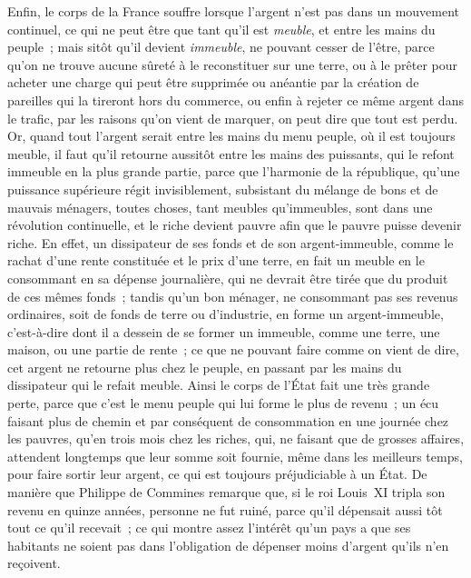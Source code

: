 \documentclass[french,twoside]{book} %
\begin{document}
Enfin, le corps de la France souffre lorsque l’argent n’est pas dans un mouvement continuel, ce qui ne peut être que tant qu’il est {\itshape meuble}, et entre les mains du peuple ; mais sitôt qu’il devient {\itshape immeuble}, ne pouvant cesser de l’être, parce qu’on ne trouve aucune sûreté à le reconstituer sur une terre, ou à le prêter pour acheter une charge qui peut être supprimée ou anéantie par la création de pareilles qui la tireront hors du commerce, ou enfin à rejeter ce même argent dans le trafic, par les raisons qu’on vient de marquer, on peut dire que tout est perdu. Or, quand tout l’argent serait entre les mains du menu peuple, où il est toujours meuble, il faut qu’il retourne aussitôt entre les mains des puissants, qui le refont immeuble en la plus grande partie, parce que l’harmonie de la république, qu’une puissance supérieure régit invisiblement, subsistant du mélange de bons et de mauvais ménagers, toutes choses, tant meubles qu’immeubles, sont dans une révolution continuelle, et le riche devient pauvre afin que le pauvre puisse devenir riche. En effet, un dissipateur de ses fonds et de son argent-immeuble, comme le rachat d’une rente constituée et le prix d’une terre, en fait un meuble en le consommant en sa dépense journalière, qui ne devrait être tirée que du produit de ces mêmes fonds ; tandis qu’un bon ménager, ne consommant pas ses revenus ordinaires, soit de fonds de terre ou d’industrie, en forme un argent-immeuble, c’est-à-dire dont il a dessein de se former un immeuble, comme une terre, une maison, ou une partie de rente ; ce que ne pouvant faire comme on vient de dire, cet argent ne retourne plus chez le peuple, en passant par les mains du dissipateur qui le refait meuble. Ainsi le corps de l’État fait une très grande perte, parce que c’est le menu peuple qui lui forme le plus de revenu ; un écu faisant plus de chemin et par conséquent de consommation en une journée chez les pauvres, qu’en trois mois chez les riches, qui, ne faisant que de grosses affaires, attendent longtemps que leur somme soit fournie, même dans les meilleurs temps, pour faire sortir leur argent, ce qui est toujours préjudiciable à un État. De manière que Philippe de Commines remarque que, si le roi Louis XI tripla son revenu en quinze années, personne ne fut ruiné, parce qu’il dépensait aussi tôt tout ce qu’il recevait ; ce qui montre assez l’intérêt qu’un pays a que ses habitants ne soient pas dans l’obligation de dépenser moins d’argent qu’ils n’en reçoivent.
\end{document}
